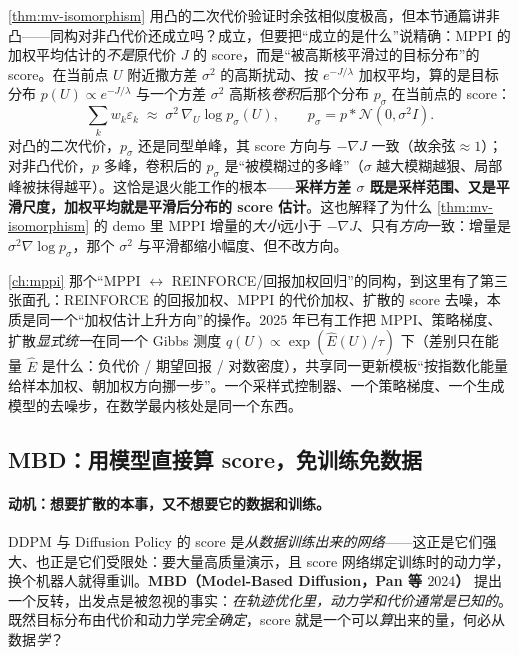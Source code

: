 \begin{derivation}[采样方差就是平滑尺度]
\cref{thm:mv-isomorphism} 用凸的二次代价验证时余弦相似度极高，但本节通篇讲非凸——同构对非凸代价还成立吗？成立，但要把“成立的是什么”说精确：MPPI 的加权平均估计的\emph{不是}原代价 $J$ 的 score，而是“被高斯核平滑过的目标分布”的 score。在当前点 $U$ 附近撒方差 $\sigma^2$ 的高斯扰动、按 $e^{-J/\lambda}$ 加权平均，算的是目标分布 $p(U)\propto e^{-J/\lambda}$ 与一个方差 $\sigma^2$ 高斯核\emph{卷积}后那个分布 $p_\sigma$ 在当前点的 score：
\begin{equation}
  \sum_k w_k\varepsilon_k \;\approx\; \sigma^2\,\nabla_U\log p_\sigma(U),\qquad p_\sigma=p * \mathcal{N}(0,\sigma^2 I).
  \label{eq:mv-smoothed-score}
\end{equation}
对凸的二次代价，$p_\sigma$ 还是同型单峰，其 score 方向与 $-\nabla J$ 一致（故余弦$\approx1$）；对非凸代价，$p$ 多峰，卷积后的 $p_\sigma$ 是“被模糊过的多峰”（$\sigma$ 越大模糊越狠、局部峰被抹得越平）。这恰是退火能工作的根本——\textbf{采样方差 $\sigma$ 既是采样范围、又是平滑尺度，加权平均就是平滑后分布的 score 估计}。这也解释了为什么 \cref{thm:mv-isomorphism} 的 demo 里 MPPI 增量的\emph{大小}远小于 $-\nabla J$、只有\emph{方向}一致：增量是 $\sigma^2\nabla\log p_\sigma$，那个 $\sigma^2$ 与平滑都缩小幅度、但不改方向。
\end{derivation}

\begin{insight}
\cref{ch:mppi} 那个“MPPI $\leftrightarrow$ REINFORCE/回报加权回归”的同构，到这里有了第三张面孔：REINFORCE 的回报加权、MPPI 的代价加权、扩散的 score 去噪，本质是同一个“加权估计上升方向”的操作。$2025$ 年已有工作把 MPPI、策略梯度、扩散\emph{显式统一}在同一个 Gibbs 测度 $q(U)\propto\exp(\hat E(U)/\tau)$ 下\cite{li2025unified}（差别只在能量 $\hat E$ 是什么：负代价 / 期望回报 / 对数密度），共享同一更新模板“按指数化能量给样本加权、朝加权方向挪一步”。一个采样式控制器、一个策略梯度、一个生成模型的去噪步，在数学最内核处是同一个东西。
\end{insight}

\subsection{MBD：用模型直接算 score，免训练免数据}
\label{sec:mv-mbd}

\paragraph{动机：想要扩散的本事，又不想要它的数据和训练。}
DDPM 与 Diffusion Policy\cite{chi2023diffusion} 的 score 是\emph{从数据训练出来的网络}——这正是它们强大、也正是它们受限处：要大量高质量演示，且 score 网络绑定训练时的动力学，换个机器人就得重训。\textbf{MBD（Model-Based Diffusion，Pan 等 $2024$）}\cite{pan2024mbd} 提出一个反转，出发点是被忽视的事实：\emph{在轨迹优化里，动力学和代价通常是已知的}。既然目标分布由代价和动力学\emph{完全确定}，score 就是一个可以\emph{算}出来的量，何必从数据\emph{学}？

